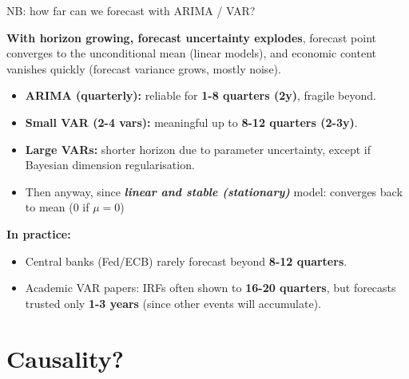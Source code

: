 \documentclass{beamer}
\begin{document}
\begin{frame}{NB: how far can we forecast with ARIMA / VAR?}

\small

 \textbf{With horizon growing, forecast uncertainty explodes}, forecast point converges to the unconditional mean (linear models), and economic content vanishes quickly (forecast variance grows, mostly noise). 

\medskip

\begin{itemize}\itemsep4pt
    \item \textbf{ARIMA (quarterly):} reliable for \textbf{1-8 quarters (2y)}, fragile beyond.
    \item \textbf{Small VAR (2-4 vars):} meaningful up to \textbf{8-12 quarters (2-3y)}.
    \item \textbf{Large VARs:} shorter horizon due to parameter uncertainty, except if Bayesian dimension regularisation.
    \item Then anyway, since \textit{\textbf{linear and stable (stationary)}} model: converges back to mean ($0$ if $\mu=0$)
\end{itemize}

\medskip

\textbf{In practice:}
\begin{itemize}\itemsep4pt
    \item Central banks (Fed/ECB) rarely forecast beyond \textbf{8-12 quarters}.
    \item Academic VAR papers: IRFs often shown to \textbf{16-20 quarters}, but forecasts trusted only \textbf{1-3 years} (since other events will accumulate).
\end{itemize}

\end{frame}

\section{Causality?}
\end{document}
